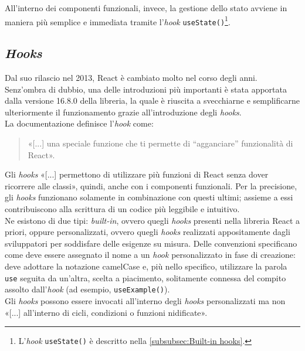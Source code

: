 All'interno dei componenti funzionali, invece, la gestione dello stato avviene in maniera più semplice e immediata tramite l'\textit{hook} \texttt{useState()}\footnote{L'\textit{hook} \texttt{useState()} è descritto nella \autoref{subsubsec:Built-in hooks}.}.


\subsection{\textit{Hooks}}
\label{subsec:Hooks}
Dal suo rilascio nel 2013, React è cambiato molto nel corso degli anni. Senz'ombra di dubbio, una delle introduzioni più importanti è stata apportata dalla versione 16.8.0 della libreria, la quale è riuscita a svecchiarne e semplificarne ulteriormente il funzionamento grazie all'introduzione degli \textit{hooks}.\\
La documentazione definisce l'\textit{hook} come:
\begin{quote}
  «[...] una speciale funzione che ti permette di “agganciare” funzionalità di React»\cite{React_UsareHookStateCosHook}.  
\end{quote}

Gli \textit{hooks} «[...] permettono di utilizzare più funzioni di React senza dover ricorrere alle classi»\cite{React_IntroduzioneHooks_ClassiConfondono}, quindi, anche con i componenti funzionali. Per la precisione, gli \textit{hooks} funzionano solamente in combinazione con questi ultimi;  assieme a essi contribuiscono alla scrittura di un codice più leggibile e intuitivo.\\
Ne esistono di due tipi: \textit{built-in}, ovvero quegli \textit{hooks} presenti nella libreria React a priori, oppure personalizzati, ovvero quegli \textit{hooks} realizzati appositamente dagli sviluppatori per soddisfare delle esigenze su misura. Delle convenzioni specificano come deve essere assegnato il nome a un \textit{hook} personalizzato in fase di creazione: deve adottare la notazione camelCase e, più nello specifico, utilizzare la parola \texttt{use} seguita da un'altra, scelta a piacimento, solitamente connessa del compito assolto dall'\textit{hook} (ad esempio, \texttt{useExample()}).\\
Gli \textit{hooks} possono essere invocati all'interno degli \textit{hooks} personalizzati ma non «[...] all'interno di cicli, condizioni o funzioni nidificate»\cite{React_PanoramicaHooks}.

